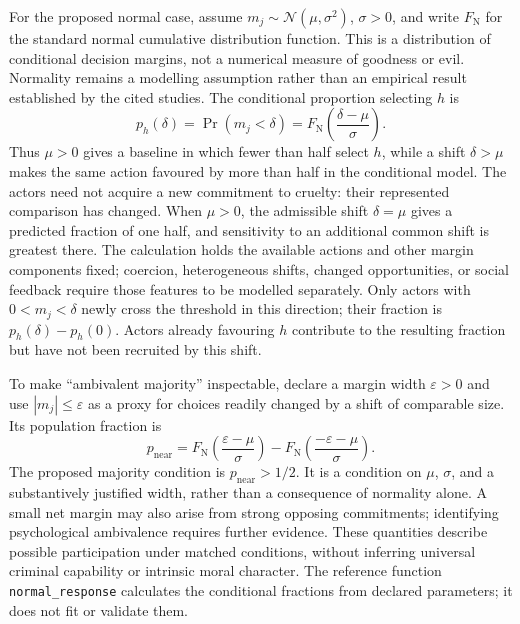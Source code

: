 \documentclass[11pt,a4paper]{article}
\theoremstyle{remark}
\begin{document}
For the proposed normal case, assume $m_j\sim\mathcal N(\mu,\sigma^2)$,
$\sigma>0$, and write $F_{\mathrm N}$ for the standard normal cumulative
distribution function. This is a distribution of conditional decision margins,
not a numerical measure of goodness or evil. Normality remains a modelling
assumption rather than an empirical result established by the cited studies.
The conditional proportion selecting $h$ is
\begin{equation}\label{eq:population-response}
p_h(\delta)=\Pr(m_j<\delta)
=F_{\mathrm N}\!\left(\frac{\delta-\mu}{\sigma}\right).
\end{equation}
Thus $\mu>0$ gives a baseline in which fewer than half select $h$, while a shift
$\delta>\mu$ makes the same action favoured by more than half in the conditional
model. The actors need not acquire a new commitment to cruelty: their represented
comparison has changed. When $\mu>0$, the admissible shift $\delta=\mu$
gives a predicted fraction of one half, and sensitivity to an additional common
shift is greatest there. The calculation
holds the available actions and other margin components fixed; coercion,
heterogeneous shifts, changed opportunities, or social feedback require those
features to be modelled separately. Only actors with $0<m_j<\delta$ newly
cross the threshold in this direction; their fraction is
$p_h(\delta)-p_h(0)$. Actors already favouring $h$ contribute to the resulting
fraction but have not been recruited by this shift.

To make ``ambivalent majority'' inspectable, declare a margin width
$\varepsilon>0$ and use $|m_j|\leq\varepsilon$ as a proxy for choices readily
changed by a shift of comparable size. Its population fraction is
\begin{equation}\label{eq:population-ambivalence}
p_{\mathrm{near}}=
F_{\mathrm N}\!\left(\frac{\varepsilon-\mu}{\sigma}\right)
-F_{\mathrm N}\!\left(\frac{-\varepsilon-\mu}{\sigma}\right).
\end{equation}
The proposed majority condition is $p_{\mathrm{near}}>1/2$. It is a condition on
$\mu$, $\sigma$, and a substantively justified width, rather than a consequence
of normality alone. A small net margin may also arise from strong opposing
commitments; identifying psychological ambivalence requires further evidence.
These quantities describe possible participation under matched conditions,
without inferring universal criminal capability or intrinsic moral character.
The reference function \texttt{normal\_response} calculates the conditional
fractions from declared parameters; it does not fit or validate them.
\end{document}
